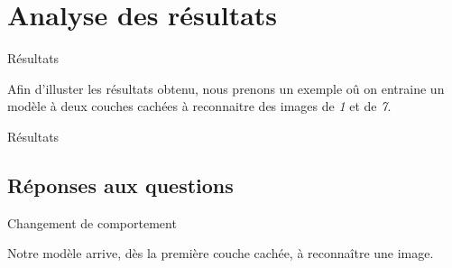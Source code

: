 \documentclass[10pt,handout]{beamer}
\newif\ifplacelogo %
\begin{document}
\section{Analyse des résultats}
\begin{frame}{Résultats}
    \begin{block}{}
        Afin d'illuster les résultats obtenu, nous prenons un exemple oû on entraine un modèle à deux couches cachées à reconnaitre des images de \textit{1} et de \textit{7}.
    \end{block}
\end{frame}

\placelogofalse
\begin{frame}{Résultats}
\end{frame}
\placelogotrue

\subsection{Réponses aux questions}
\begin{frame}{Changement de comportement}
    \begin{block}{}
        Notre modèle arrive, dès la première couche cachée, à reconnaître une image.
    \end{block}
    
\end{frame}
\end{document}
